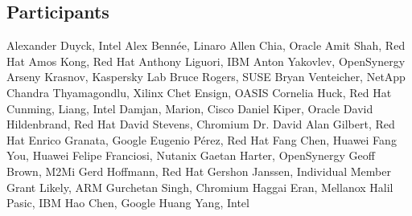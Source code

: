 \subsection*{Participants}
Alexander Duyck, Intel \newline
Alex Bennée, Linaro \newline
Allen Chia, Oracle	\newline
Amit Shah,	Red Hat	\newline
Amos Kong,	Red Hat	\newline
Anthony Liguori,	IBM	\newline
Anton Yakovlev, OpenSynergy \newline
Arseny Krasnov, Kaspersky Lab \newline
Bruce Rogers, SUSE	\newline
Bryan Venteicher,	NetApp	\newline
Chandra Thyamagondlu, Xilinx	\newline
Chet Ensign, OASIS	\newline
Cornelia Huck,	Red Hat	\newline
Cunming, Liang, Intel	\newline
Damjan, Marion, Cisco	\newline
Daniel Kiper,	Oracle	\newline
David Hildenbrand, Red Hat \newline
David Stevens, Chromium \newline
Dr. David Alan Gilbert, Red Hat \newline
Enrico Granata, Google \newline
Eugenio Pérez, Red Hat \newline
Fang Chen, Huawei	\newline
Fang You, Huawei	\newline
Felipe Franciosi, Nutanix \newline
Gaetan Harter, OpenSynergy \newline
Geoff Brown,	M2Mi	\newline
Gerd Hoffmann, Red Hat	\newline
Gershon Janssen,	Individual Member	\newline
Grant Likely, ARM	\newline
Gurchetan Singh, Chromium \newline
Haggai Eran,	Mellanox	\newline
Halil Pasic,	IBM	\newline
Hao Chen, Google \newline
Huang Yang, Intel \newline
